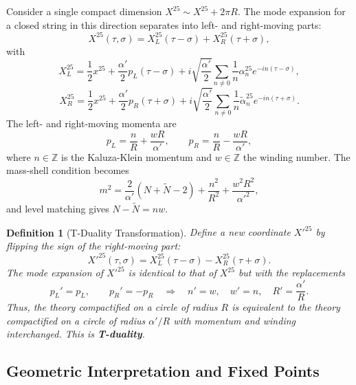 \documentclass[11pt]{article}
\newtheorem{definition}{Definition}
\renewcommand{\tilde}{\widetilde}
\begin{document}
Consider a single compact dimension $X^{25} \sim X^{25} + 2\pi R$. The mode expansion for a closed string in this direction separates into left- and right-moving parts:
\begin{equation}
X^{25}(\tau,\sigma) = X_L^{25}(\tau-\sigma) + X_R^{25}(\tau+\sigma),
\end{equation}
with
\begin{equation}
X_L^{25} = \frac{1}{2}x^{25} + \frac{\alpha'}{2} p_L (\tau-\sigma) + i\sqrt{\frac{\alpha'}{2}} \sum_{n\neq0} \frac{1}{n} \alpha_n^{25} e^{-in(\tau-\sigma)},
\end{equation}
\begin{equation}
X_R^{25} = \frac{1}{2}x^{25} + \frac{\alpha'}{2} p_R (\tau+\sigma) + i\sqrt{\frac{\alpha'}{2}} \sum_{n\neq0} \frac{1}{n} \tilde{\alpha}_n^{25} e^{-in(\tau+\sigma)}.
\end{equation}
The left- and right-moving momenta are
\begin{equation}
p_L = \frac{n}{R} + \frac{wR}{\alpha'}, \qquad p_R = \frac{n}{R} - \frac{wR}{\alpha'},
\end{equation}
where $n\in\mathbb{Z}$ is the Kaluza-Klein momentum and $w\in\mathbb{Z}$ the winding number. The mass-shell condition becomes
\begin{equation}
m^2 = \frac{2}{\alpha'}(N+\tilde{N}-2) + \frac{n^2}{R^2} + \frac{w^2 R^2}{\alpha'^2},
\end{equation}
and level matching gives $N-\tilde{N} = nw$.

\begin{definition}[T-Duality Transformation]
Define a new coordinate $X'^{25}$ by flipping the sign of the right-moving part:
\begin{equation}
X'^{25}(\tau,\sigma) = X_L^{25}(\tau-\sigma) - X_R^{25}(\tau+\sigma).
\end{equation}
The mode expansion of $X'^{25}$ is identical to that of $X^{25}$ but with the replacements
\begin{equation}
p_L' = p_L, \qquad p_R' = -p_R \quad \Longrightarrow \quad n' = w, \quad w' = n, \quad R' = \frac{\alpha'}{R}.
\end{equation}
Thus, the theory compactified on a circle of radius $R$ is equivalent to the theory compactified on a circle of radius $\alpha'/R$ with momentum and winding interchanged. This is \textbf{T-duality}.
\end{definition}

\subsection{Geometric Interpretation and Fixed Points}
\end{document}
